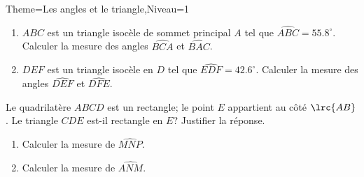 \documentclass[a4paper,12pt]{article}
\begin{document}
\begin{Maquette}[Fiche]{Theme=Les angles et le triangle,Niveau=1}
\begin{exercice}
\begin{enumerate}
\item $ABC$ est un triangle isocèle de sommet principal $A$ tel que $\widehat{ABC}=55.8^{\circ}$.\newline
Calculer la mesure des angles $\widehat{BCA}$ et $\widehat{BAC}$.
\item $DEF$ est un triangle isocèle en $D$ tel que $\widehat{EDF}=42.6^{\circ}$.\newline
Calculer la mesure des angles $\widehat{DEF}$ et $\widehat{DFE}$.
\end{enumerate}
\end{exercice}

\begin{exercice}
\begin{minipage}{0.5\linewidth}
Le quadrilatère $ABCD$ est un rectangle; le point $E$ appartient au côté $\lrc{AB}$.
Le triangle $CDE$ est-il rectangle en $E$? Justifier la réponse.
\end{minipage}\hfill%
\begin{minipage}{0.4\linewidth}
\end{minipage}
\end{exercice}

\begin{exercice}
\begin{minipage}{0.6\linewidth}
\begin{enumerate}
\item Calculer la mesure de $\widehat{MNP}$.
\item Calculer la mesure de $\widehat{ANM}$.
\end{enumerate}
\end{minipage}%
\begin{minipage}{0.4\linewidth}
\end{minipage}
\end{exercice}


\end{Maquette}
\end{document}
